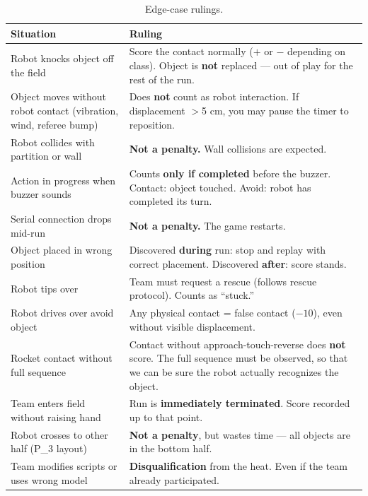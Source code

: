 \documentclass[a4]{article}
\begin{document}
\begin{table}[H]
\centering
\begin{tabular}{p{5.5cm}p{8.5cm}}
\toprule
\textbf{Situation} & \textbf{Ruling} \\
\midrule
Robot knocks object off the field & Score the contact normally ($+$ or $-$ depending on class). Object is \textbf{not} replaced --- out of play for the rest of the run. \\
\addlinespace
Object moves without robot contact (vibration, wind, referee bump) & Does \textbf{not} count as robot interaction. If displacement $>$5 cm, you may pause the timer to reposition. \\
\addlinespace
Robot collides with partition or wall & \textbf{Not a penalty.} Wall collisions are expected. \\
\addlinespace
Action in progress when buzzer sounds & Counts \textbf{only if completed} before the buzzer. Contact: object touched. Avoid: robot has completed its turn. \\
\addlinespace
Serial connection drops mid-run & \textbf{Not a penalty.} The game restarts. \\
\addlinespace
Object placed in wrong position & Discovered \textbf{during} run: stop and replay with correct placement. Discovered \textbf{after}: score stands. \\
\addlinespace
Robot tips over & Team must request a rescue (follows rescue protocol). Counts as ``stuck.'' \\
\addlinespace
Robot drives over avoid object & Any physical contact = false contact ($-10$), even without visible displacement. \\
\addlinespace
Rocket contact without full sequence & Contact without approach-touch-reverse does \textbf{not} score. The full sequence must be observed, so that we can be sure the robot actually recognizes the object. \\
\addlinespace
Team enters field without raising hand & Run is \textbf{immediately terminated}. Score recorded up to that point. \\
\addlinespace
Robot crosses to other half (P\_3 layout) & \textbf{Not a penalty}, but wastes time --- all objects are in the bottom half. \\
\addlinespace
Team modifies scripts or uses wrong model & \textbf{Disqualification} from the heat. Even if the team already participated. \\
\bottomrule
\end{tabular}
\caption{Edge-case rulings.}
\end{table}
\end{document}
